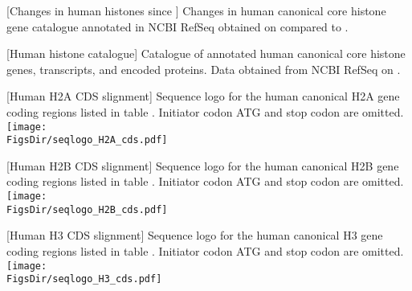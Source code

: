   \begin{center}
    [Changes in human histones since \citet{Marzluff02}]{%
        Changes in human canonical core histone gene catalogue
        annotated in NCBI RefSeq obtained on \SequencesDate{}
        compared to \citet{Marzluff02}.
    }
    \label{tab:difference-from-Marzluff02}
    
  \end{center}

  \newpage
  [Human histone catalogue]{%
    Catalogue of annotated human canonical core histone genes, transcripts,
    and encoded proteins.
    Data obtained from NCBI RefSeq \citep{OLearyRefseq2016} on \SequencesDate{}.
  }
  \label{tab:histone-catalogue}
  

  \newpage
  \begin{minipage}{\textwidth}
  \begin{center}
    [Human H2A CDS slignment]{
        Sequence logo for the human canonical H2A gene coding regions
        listed in table .
        Initiator codon ATG and stop codon are omitted.
    }
    \label{fig:h2a-histone-gene-variation}
    \texttt{[image: \\FigsDir/seqlogo\_H2A\_cds.pdf]}
  \end{center}
  \end{minipage}

  \newpage
  \begin{minipage}{\textwidth}
  \begin{center}
    [Human H2B CDS slignment]{
        Sequence logo for the human canonical H2B gene coding regions
        listed in table .
        Initiator codon ATG and stop codon are omitted.
    }
    \label{fig:h2b-histone-gene-variation}
    \texttt{[image: \\FigsDir/seqlogo\_H2B\_cds.pdf]}
  \end{center}
  \end{minipage}

  \newpage
  \begin{minipage}{\textwidth}
  \begin{center}
    [Human H3 CDS slignment]{
        Sequence logo for the human canonical H3 gene coding regions
        listed in table .
        Initiator codon ATG and stop codon are omitted.
    }
    \label{fig:h3-histone-gene-variation}
    \texttt{[image: \\FigsDir/seqlogo\_H3\_cds.pdf]}
  \end{center}
  \end{minipage}

